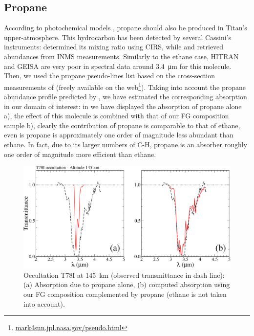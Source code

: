 \documentclass{arxiv-icarus}
\begin{document}
\subsection{Propane}

According to photochemical models \citep{Lavvas2008b,Lavvas2008c,Krasnopolsky2014}, propane should also be produced in
Titan's upper-atmosphere. This  hydrocarbon has been detected by several Cassini's instruments: \cite{Nixon2013} determined its mixing ratio using CIRS, while \cite{Cui2009} and \cite{Magee2009} retrieved abundances from INMS measurements.
Similarly to the ethane case, HITRAN and GEISA are very poor in spectral data around \SI{3.4}{\um} for this molecule. Then, we used the propane pseudo-lines list based on the cross-section measurements of \cite{Harrison2010a} (freely available on the web\footnote{\href{http://mark4sun.jpl.nasa.gov/pseudo.html}{mark4sun.jpl.nasa.gov/pseudo.html}}). Taking into account the propane abundance profile predicted by \cite{Krasnopolsky2014}, we have estimated the corresponding absorption in our domain of interest: in  we have displayed the absorption of propane alone a), the effect of this molecule is combined with that of our FG composition sample b), clearly the contribution of propane is comparable to that of ethane, even is propane is approximately one order of magnitude less abundant than ethane. In fact, due to its larger numbers of C-H, propane is an absorber roughly one order of magnitude more efficient than ethane.


\begin{figure}[!ht]
    \includegraphics[width=\linewidth]{Fig_6}
    \caption{Occultation T78I at \SI{145}{km} (observed transmittance in dash line): (a) Absorption due to propane alone, (b) computed absorption using our FG composition complemented by propane (ethane is not taken into account).}
    \label{fig:C3H8}
\end{figure}
\end{document}

